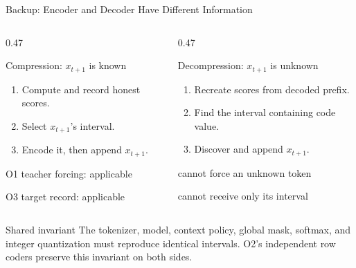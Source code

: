 \begin{frame}{Backup: Encoder and Decoder Have Different Information}
  \begin{columns}[T,onlytextwidth]
    \begin{column}{0.47\textwidth}
      \begin{block}{Compression: $x_{t+1}$ is known}
        \begin{enumerate}
          \item Compute and record honest scores.
          \item Select $x_{t+1}$'s interval.
          \item Encode it, then append $x_{t+1}$.
        \end{enumerate}
      \end{block}
      \vspace{0.4em}
      \centering
      \textcolor{mDarkTeal}{O1 teacher forcing: applicable}\par
      \textcolor{mDarkTeal}{O3 target record: applicable}
    \end{column}
    \hfill
    \begin{column}{0.47\textwidth}
      \begin{block}{Decompression: $x_{t+1}$ is unknown}
        \begin{enumerate}
          \item Recreate scores from decoded prefix.
          \item Find the interval containing code value.
          \item Discover and append $x_{t+1}$.
        \end{enumerate}
      \end{block}
      \vspace{0.4em}
      \centering
      \textcolor{red!70!black}{cannot force an unknown token}\par
      \textcolor{red!70!black}{cannot receive only its interval}
    \end{column}
  \end{columns}
    \vspace{0.9em}
  \begin{block}{Shared invariant}
    The tokenizer, model, context policy, global mask, softmax, and integer quantization must reproduce identical intervals. O2's independent row coders preserve this invariant on both sides.
  \end{block}
\end{frame}



